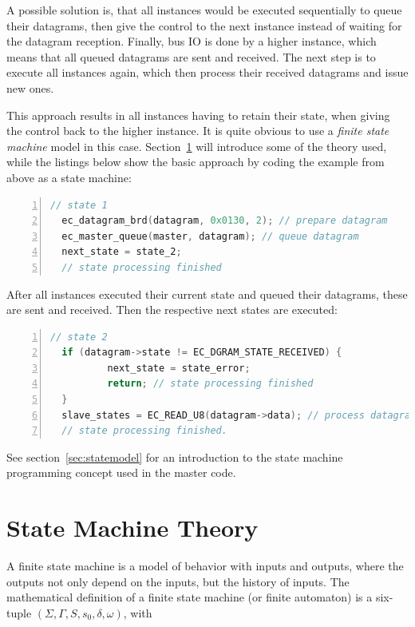 \documentclass[a4paper,12pt,BCOR6mm,bibtotoc,idxtotoc]{scrbook}
\begin{document}
A possible solution is, that all instances would be executed
sequentially to queue their datagrams, then give the control to the
next instance instead of waiting for the datagram reception. Finally,
bus IO is done by a higher instance, which means that all queued
datagrams are sent and received. The next step is to execute all
instances again, which then process their received datagrams and issue
new ones.

This approach results in all instances having to retain their state,
when giving the control back to the higher instance. It is quite
obvious to use a \textit{finite state machine} model in this case.
Section~\ref{sec:fsmtheory} will introduce some of the theory used,
while the listings below show the basic approach by coding the example
from above as a state machine:

\begin{lstlisting}[gobble=2,language=C,numbers=left]
  // state 1
  ec_datagram_brd(datagram, 0x0130, 2); // prepare datagram
  ec_master_queue(master, datagram); // queue datagram
  next_state = state_2;
  // state processing finished
\end{lstlisting}

After all instances executed their current state and queued their
datagrams, these are sent and received. Then the respective next
states are executed:

\begin{lstlisting}[gobble=2,language=C,numbers=left]
  // state 2
  if (datagram->state != EC_DGRAM_STATE_RECEIVED) {
          next_state = state_error;
          return; // state processing finished
  }
  slave_states = EC_READ_U8(datagram->data); // process datagram
  // state processing finished.
\end{lstlisting}

See section~\ref{sec:statemodel} for an introduction to the
state machine programming concept used in the master code.


\section{State Machine Theory}
\label{sec:fsmtheory}

A finite state machine \cite{automata} is a model of behavior with
inputs and outputs, where the outputs not only depend on the inputs,
but the history of inputs. The mathematical definition of a finite
state machine (or finite automaton) is a six-tuple $(\Sigma, \Gamma,
S, s_0, \delta, \omega)$, with
\end{document}
